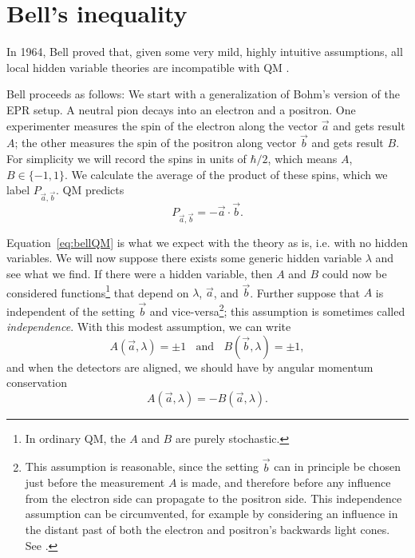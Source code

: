\section{Bell's inequality}
In 1964, Bell proved that, given some very mild, highly intuitive assumptions,
all local hidden variable theories are incompatible with QM
\cite{bell_einstein_1964}.

Bell proceeds as follows: We start with a generalization of Bohm's version
of the EPR setup. A neutral pion decays into an electron and a positron.
One experimenter measures the spin of the electron along the vector
$\vec{a}$ and gets result $A$; the other measures the spin of the positron
along vector $\vec{b}$ and gets result $B$. For simplicity we will record
the spins in units of $\hbar/2$, which means $A$, $B\in\{-1,1\}$. We
calculate the average of the product of these spins, which we label 
$P_{\vec{a},\vec{b}}$.
QM predicts
\begin{equation}\label{eq:bellQM}
  P_{\vec{a},\vec{b}}=-\vec{a}\cdot\vec{b}.
\end{equation}

Equation~\eqref{eq:bellQM} is what we expect with the theory as is, i.e. with
no hidden variables.
We will now suppose there exists some generic hidden variable $\lambda$ and see
what we find. If there were a hidden variable, then $A$ and $B$ could now
be considered functions\footnote{In ordinary QM, the $A$ and $B$ are
purely stochastic.} that depend
on $\lambda$, $\vec{a}$, and $\vec{b}$. Further suppose
that $A$ is independent of the setting $\vec{b}$ and
vice-versa\footnote{This assumption is reasonable, since the setting 
$\vec{b}$ can
in principle be chosen just before the measurement $A$ is made, and therefore
before any influence from the electron side can propagate to the positron side.
This independence assumption can be circumvented, for example by considering
an influence in the distant past of both the electron and positron's
backwards light cones. See .}; this
assumption is sometimes called {\it independence}. With this modest
assumption, we can write
\begin{equation}\label{eq:bellindep}
  A(\vec{a},\lambda)=\pm1~~~~\text{and}~~~~B(\vec{b},\lambda)=\pm1,
\end{equation}
and when the detectors are aligned, we should have by angular momentum 
conservation
\begin{equation}
  A(\vec{a},\lambda)=-B(\vec{a},\lambda).
\end{equation}

